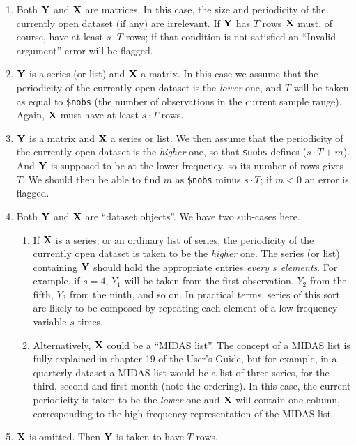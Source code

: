 \begin{enumerate}
\item Both $\mathbf{Y}$ and $\mathbf{X}$ are matrices. In this case, the size and
  periodicity of the currently open dataset (if any) are irrelevant.
  If $\mathbf{Y}$ has $T$ rows $\mathbf{X}$ must, of course, have at least
  $s \cdot T$ rows; if that condition is not satisfied an ``Invalid
  argument'' error will be flagged.
\item $\mathbf{Y}$ is a series (or list) and $\mathbf{X}$ a matrix. In this case we
  assume that the periodicity of the currently open dataset is the
  \emph{lower} one, and $T$ will be taken as equal to \texttt{\$nobs}
  (the number of observations in the current sample range). Again,
  $\mathbf{X}$ must have at least $s \cdot T$ rows.
\item $\mathbf{Y}$ is a matrix and $\mathbf{X}$ a series or list.  We then assume
  that the periodicity of the currently open dataset is the
  \emph{higher} one, so that \texttt{\$nobs} defines
  ($s \cdot T + m$). And $\mathbf{Y}$ is supposed to be at the lower
  frequency, so its number of rows gives $T$. We should then be able
  to find $m$ as \texttt{\$nobs} minus $s \cdot T$; if $m < 0$ an
  error is flagged.
\item Both $\mathbf{Y}$ and $\mathbf{X}$ are ``dataset objects''.  We have two
  sub-cases here.
  \begin{enumerate}
  \item If $\mathbf{X}$ is a series, or an ordinary list of series, the
    periodicity of the currently open dataset is taken to be the
    \emph{higher} one. The series (or list) containing $\mathbf{Y}$ should
    hold the appropriate entries \emph{every $s$ elements}. For
    example, if $s = 4$, $Y_1$ will be taken from the first
    observation, $Y_2$ from the fifth, $Y_3$ from the ninth, and so
    on. In practical terms, series of this sort are likely to be
    composed by repeating each element of a low-frequency variable $s$
    times.
  \item Alternatively, $\mathbf{X}$ could be a ``MIDAS list''. The concept of
    a MIDAS list is fully explained in chapter 19 of the User's Guide,
    but for example, in a quarterly dataset a MIDAS list would be a
    list of three series, for the third, second and first month (note
    the ordering). In this case, the current periodicity is taken to
    be the \emph{lower} one and $\mathbf{X}$ will contain one column,
    corresponding to the high-frequency representation of the MIDAS
    list.
  \end{enumerate}
\item $\mathbf{X}$ is omitted. Then $\mathbf{Y}$ is taken to have $T$ rows. 
\end{enumerate}

